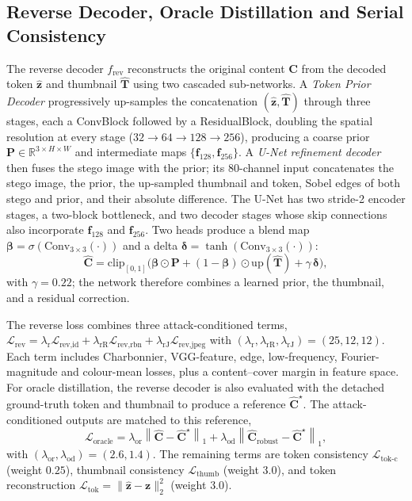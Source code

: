 \documentclass[runningheads]{llncs}
\begin{document}
\subsection{Reverse Decoder, Oracle Distillation and Serial Consistency}
\label{sec:rev}
The reverse decoder $f_{\text{rev}}$ reconstructs the original content $\mathbf{C}$ from the decoded token $\hat{\mathbf{z}}$ and thumbnail $\hat{\mathbf{T}}$ using two cascaded sub-networks. A \emph{Token Prior Decoder} progressively up-samples the concatenation $(\hat{\mathbf{z}},\hat{\mathbf{T}})$ through three stages, each a ConvBlock followed by a ResidualBlock, doubling the spatial resolution at every stage ($32\!\to\!64\!\to\!128\!\to\!256$), producing a coarse prior $\mathbf{P}\!\in\!\mathbb{R}^{3\times H\times W}$ and intermediate maps $\{\mathbf{f}_{128},\mathbf{f}_{256}\}$. A \emph{U-Net refinement decoder} then fuses the stego image with the prior; its $80$-channel input concatenates the stego image, the prior, the up-sampled thumbnail and token, Sobel edges of both stego and prior, and their absolute difference. The U-Net has two stride-2 encoder stages, a two-block bottleneck, and two decoder stages whose skip connections also incorporate $\mathbf{f}_{128}$ and $\mathbf{f}_{256}$. Two heads produce a blend map $\boldsymbol{\beta}=\sigma(\text{Conv}_{3\times3}(\cdot))$ and a delta $\boldsymbol{\delta}=\tanh(\text{Conv}_{3\times3}(\cdot))$:
\begin{equation}
    \hat{\mathbf{C}} = \mathrm{clip}_{[0,1]}\!\Big(\boldsymbol{\beta}\odot\mathbf{P} + (1{-}\boldsymbol{\beta})\odot\mathrm{up}(\hat{\mathbf{T}}) + \gamma\,\boldsymbol{\delta}\Big),
    \label{eq:revdec}
\end{equation}
with $\gamma\!=\!0.22$; the network therefore combines a learned prior, the thumbnail, and a residual correction.



The reverse loss combines three attack-conditioned terms, $\mathcal{L}_{\text{rev}} = \lambda_{\text{r}}\mathcal{L}_{\text{rev,id}} + \lambda_{\text{rR}}\mathcal{L}_{\text{rev,rbn}} + \lambda_{\text{rJ}}\mathcal{L}_{\text{rev,jpeg}}$ with $(\lambda_{\text{r}},\lambda_{\text{rR}},\lambda_{\text{rJ}})=(25,12,12)$. Each term includes Charbonnier, VGG-feature, edge, low-frequency, Fourier-magnitude and colour-mean losses, plus a content--cover margin in feature space. For oracle distillation, the reverse decoder is also evaluated with the detached ground-truth token and thumbnail to produce a reference $\hat{\mathbf{C}}^{\star}$. The attack-conditioned outputs are matched to this reference,
\begin{equation}
    \mathcal{L}_{\text{oracle}} = \lambda_{\text{or}}\!\left\|\hat{\mathbf{C}}-\hat{\mathbf{C}}^{\star}\right\|_1
    + \lambda_{\text{od}}\!\left\|\hat{\mathbf{C}}_{\text{robust}}-\hat{\mathbf{C}}^{\star}\right\|_1, \label{eq:oracle}
\end{equation}
with $(\lambda_{\text{or}},\lambda_{\text{od}})=(2.6,1.4)$. The remaining terms are token consistency $\mathcal{L}_{\text{tok-c}}$ (weight $0.25$), thumbnail consistency $\mathcal{L}_{\text{thumb}}$ (weight $3.0$), and token reconstruction $\mathcal{L}_{\text{tok}}=\|\hat{\mathbf{z}}-\mathbf{z}\|_2^2$ (weight $3.0$).
\end{document}
